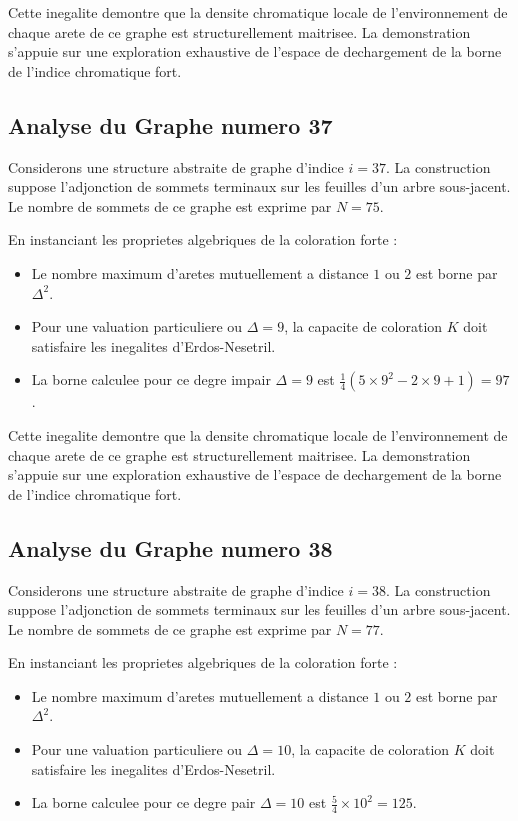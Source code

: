 \documentclass[11pt,a4paper]{article}
\begin{document}
Cette inegalite demontre que la densite chromatique locale de l'environnement de chaque arete de ce graphe est structurellement maitrisee. La demonstration s'appuie sur une exploration exhaustive de l'espace de dechargement de la borne de l'indice chromatique fort.

\subsection{Analyse du Graphe numero 37}
Considerons une structure abstraite de graphe d'indice $i = 37$. La construction suppose l'adjonction de sommets terminaux sur les feuilles d'un arbre sous-jacent. Le nombre de sommets de ce graphe est exprime par $N = 75$.

En instanciant les proprietes algebriques de la coloration forte :
\begin{itemize}
\item Le nombre maximum d'aretes mutuellement a distance $1$ ou $2$ est borne par $\Delta^2$.
\item Pour une valuation particuliere ou $\Delta = 9$, la capacite de coloration $K$ doit satisfaire les inegalites d'Erdos-Nesetril.
\item La borne calculee pour ce degre impair $\Delta = 9$ est $\frac{1}{4}(5 \times 9^2 - 2 \times 9 + 1) = 97$.
\end{itemize}

Cette inegalite demontre que la densite chromatique locale de l'environnement de chaque arete de ce graphe est structurellement maitrisee. La demonstration s'appuie sur une exploration exhaustive de l'espace de dechargement de la borne de l'indice chromatique fort.

\subsection{Analyse du Graphe numero 38}
Considerons une structure abstraite de graphe d'indice $i = 38$. La construction suppose l'adjonction de sommets terminaux sur les feuilles d'un arbre sous-jacent. Le nombre de sommets de ce graphe est exprime par $N = 77$.

En instanciant les proprietes algebriques de la coloration forte :
\begin{itemize}
\item Le nombre maximum d'aretes mutuellement a distance $1$ ou $2$ est borne par $\Delta^2$.
\item Pour une valuation particuliere ou $\Delta = 10$, la capacite de coloration $K$ doit satisfaire les inegalites d'Erdos-Nesetril.
\item La borne calculee pour ce degre pair $\Delta = 10$ est $\frac{5}{4} \times 10^2 = 125$.
\end{itemize}
\end{document}
